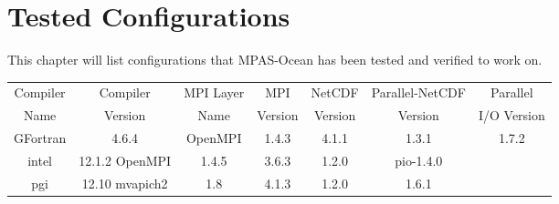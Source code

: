 \chapter{Tested Configurations}
\label{chap:tested-configurations}
This chapter will list configurations that MPAS-Ocean has been tested and verified to work on.


\begin{tabular}{| c | c | c | c | c | c | c |}
	\hline
	Compiler & Compiler & MPI Layer & MPI & NetCDF & Parallel-NetCDF & Parallel \\
	Name & Version & Name & Version & Version & Version & I/O Version \\
	\hline
	GFortran & 4.6.4 & OpenMPI & 1.4.3 & 4.1.1 & 1.3.1 & 1.7.2  \\
	\hline
	intel & 12.1.2 OpenMPI & 1.4.5 & 3.6.3 & 1.2.0 & pio-1.4.0 \\
	\hline
	pgi & 12.10 mvapich2 & 1.8 & 4.1.3  & 1.2.0  & 1.6.1  \\
	\hline
\end{tabular}

